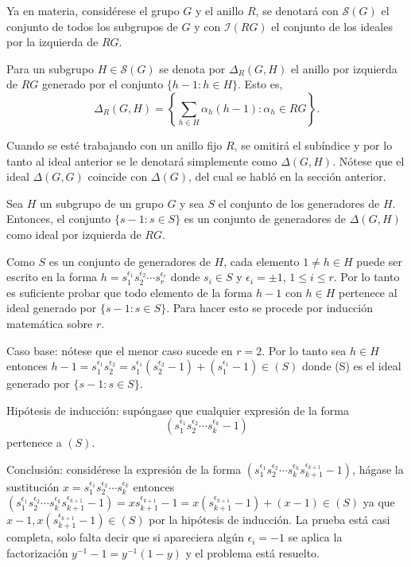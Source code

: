 Ya en materia, considérese el grupo $G$ y el anillo $R$, se denotará con $\mathcal{S}(G)$  el conjunto de todos los subgrupos de $G$ y con $\mathcal{I}(RG)$ el conjunto de los ideales por la izquierda de $RG$.
\begin{definicion}
Para un subgrupo $H \in \mathcal{S}(G)$ se denota por $\Delta_{R}(G,H)$ el anillo por izquierda de $RG$ generado por el conjunto $\{h-1: h \in H \}$. Esto es, 
\begin{equation}
\Delta_{R}(G,H) = \left\{ \sum_{h \in H} \alpha_h(h-1) : \alpha_h \in RG \right\}.
\end{equation}
\end{definicion}

Cuando se esté trabajando con un anillo fijo $R$, se omitirá el subíndice y por lo tanto al ideal anterior se le denotará simplemente como $\Delta(G,H)$. Nótese que el ideal $\Delta(G,G)$ coincide con $\Delta(G)$, del cual se habló en la sección anterior.
\begin{lema}
Sea $H$ un subgrupo de un grupo $G$ y sea $S$ el conjunto de los generadores de $H$. Entonces, el conjunto $\{ s-1 : s \in S \}$ es un conjunto de generadores de $\Delta (G,H) $ como ideal por izquierda de $RG$.
\end{lema}
\begin{proof*}
Como $S$ es un conjunto de generadores de $H$, cada elemento $1 \neq h \in H$ puede ser escrito en la forma $h=s_1^{\epsilon_1} s_2^{\epsilon_2} \cdots s_r^{\epsilon_r} $ donde $s_i \in S$ y $\epsilon_i =\pm 1$, $1 \leq i \leq r$. Por lo tanto es suficiente probar que todo elemento de la forma $h-1$ con $h \in H$  pertenece al ideal generado por $\{s-1 : s \in S \}$. Para hacer esto se procede por inducción matemática sobre $r$. 

Caso base: nótese que el menor caso sucede en $r =2$. Por lo tanto sea $h \in H$ entonces $h-1 = s_1^{\epsilon_1} s_2^{\epsilon_2} = s_1^{\epsilon_1}( s_2^{\epsilon_2} -1 ) + ( s_1^{\epsilon_1} -1 ) \in (S)  $ donde (S) es el ideal generado por $\{ s-1 : s \in S \}$.

Hipótesis de inducción: supóngase que cualquier expresión de la forma \[(s_1^{\epsilon_1} s_2^{\epsilon_2} \cdots s_k^{\epsilon_k} -1)\]
pertenece a $(S)$.


Conclusión: considérese la expresión de la forma $ (s_1^{\epsilon_1} s_2^{\epsilon_2} \cdots s_k^{\epsilon_k}s_{k+1}^{\epsilon_{k+1}} -1) $, hágase la sustitución $x =  s_1^{\epsilon_1} s_2^{\epsilon_2} \cdots s_k^{\epsilon_k} $ entonces $ (s_1^{\epsilon_1} s_2^{\epsilon_2} \cdots s_k^{\epsilon_k}s_{k+1}^{\epsilon_{k+1}} -1)  = x s_{k+1}^{\epsilon_{k+1}} -1 = x( s_{k+1}^{\epsilon_{k+1}} -1 ) + (x-1) \in (S) $ ya que $x-1, x( s_{k+1}^{\epsilon_{k+1}} -1 ) \in (S)$ por la hipótesis de inducción. La prueba está casi completa, solo falta decir que si apareciera algún $\epsilon_i = -1$ se aplica la factorización $y^{-1}-1 = y^{-1}(1-y)$ y el problema está resuelto.
\end{proof*}
